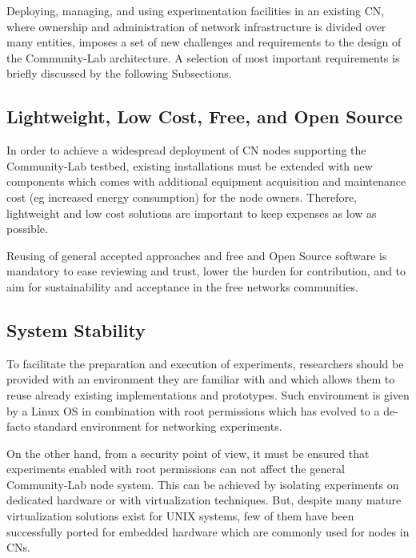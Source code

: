 \documentclass[conference]{IEEEtran}
\begin{document}
Deploying, managing, and using experimentation facilities in an
existing CN, where ownership and administration of network
infrastructure is divided over many entities, imposes a set of new
challenges and requirements to the design of the Community-Lab
architecture. A selection of most important requirements is briefly
discussed by the following Subsections.


\subsection{Lightweight, Low Cost, Free, and Open Source}

In order to achieve a widespread deployment of CN nodes supporting the
Community-Lab testbed, existing installations must be extended with new
components which comes with additional equipment acquisition and
maintenance cost (eg increased energy consumption) for the node
owners. Therefore, lightweight and low cost solutions are important to
keep expenses as low as possible.

Reusing of general accepted approaches and free and Open Source
software is mandatory to ease reviewing and trust, lower the burden
for contribution, and to aim for sustainability and acceptance in the
free networks communities.

\subsection{System Stability}

To facilitate the preparation and execution of experiments,
researchers should be provided with an environment they are familiar
with and which allows them to reuse already existing implementations
and prototypes.  Such environment is given by a Linux OS in
combination with root permissions which has evolved to a de-facto
standard environment for networking experiments.

On the other hand, from a security point of view, it must be ensured
that experiments enabled with root permissions can not affect the
general Community-Lab node system. This can be achieved by isolating
experiments on dedicated hardware or with virtualization techniques.
But, despite many mature virtualization solutions exist for UNIX
systems, few of them have been successfully ported for embedded
hardware which are commonly used for nodes in CNs.
\end{document}
